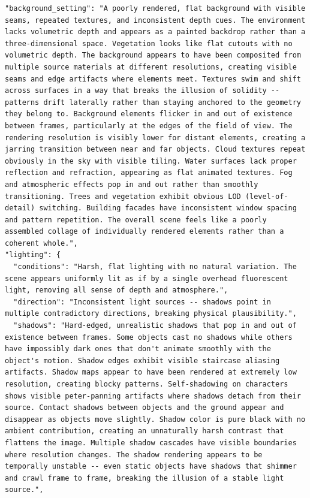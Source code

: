 \begin{tcolorbox}
\begin{Verbatim}[breaklines=true,breakanywhere=true,fontsize=\scriptsize]
"background_setting": "A poorly rendered, flat background with visible seams, repeated textures, and inconsistent depth cues. The environment lacks volumetric depth and appears as a painted backdrop rather than a three-dimensional space. Vegetation looks like flat cutouts with no volumetric depth. The background appears to have been composited from multiple source materials at different resolutions, creating visible seams and edge artifacts where elements meet. Textures swim and shift across surfaces in a way that breaks the illusion of solidity -- patterns drift laterally rather than staying anchored to the geometry they belong to. Background elements flicker in and out of existence between frames, particularly at the edges of the field of view. The rendering resolution is visibly lower for distant elements, creating a jarring transition between near and far objects. Cloud textures repeat obviously in the sky with visible tiling. Water surfaces lack proper reflection and refraction, appearing as flat animated textures. Fog and atmospheric effects pop in and out rather than smoothly transitioning. Trees and vegetation exhibit obvious LOD (level-of-detail) switching. Building facades have inconsistent window spacing and pattern repetition. The overall scene feels like a poorly assembled collage of individually rendered elements rather than a coherent whole.",
"lighting": {
  "conditions": "Harsh, flat lighting with no natural variation. The scene appears uniformly lit as if by a single overhead fluorescent light, removing all sense of depth and atmosphere.",
  "direction": "Inconsistent light sources -- shadows point in multiple contradictory directions, breaking physical plausibility.",
  "shadows": "Hard-edged, unrealistic shadows that pop in and out of existence between frames. Some objects cast no shadows while others have impossibly dark ones that don't animate smoothly with the object's motion. Shadow edges exhibit visible staircase aliasing artifacts. Shadow maps appear to have been rendered at extremely low resolution, creating blocky patterns. Self-shadowing on characters shows visible peter-panning artifacts where shadows detach from their source. Contact shadows between objects and the ground appear and disappear as objects move slightly. Shadow color is pure black with no ambient contribution, creating an unnaturally harsh contrast that flattens the image. Multiple shadow cascades have visible boundaries where resolution changes. The shadow rendering appears to be temporally unstable -- even static objects have shadows that shimmer and crawl frame to frame, breaking the illusion of a stable light source.",

\end{Verbatim}
\end{tcolorbox}
